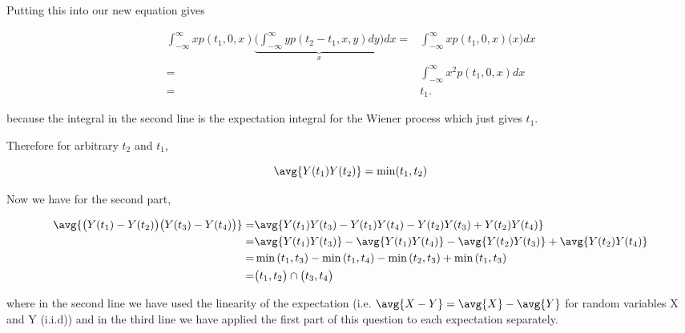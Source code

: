 Putting this into our new equation gives 

\begin{align*}
\int_{-\infty}^{\infty} x p(t_1, 0, x) \underbrace{ \bigg( \int_{-\infty}^{\infty} y p(t_2 - t_1, x, y)dy \bigg) }_x dx =& \int_{-\infty}^{\infty} x p(t_1, 0, x) \big( x \big) dx \\
= & \int_{-\infty}^{\infty} x^2 p(t_1, 0, x) dx\\
= & t_1 .
\end{align*}

because the integral in the second line is the expectation integral for the Wiener process which just gives $t_1$.

Therefore for arbitrary $t_2$ and $t_1$, 

\begin{equation*}
\avg{Y(t_1)Y(t_2)} = \min(t_1, t_2)
\end{equation*}

Now we have for the second part, 

\begin{align*}
\avg{ \big( Y(t_1) - Y(t_2) \big)  \big( Y(t_3) - Y(t_4) \big) } =& \avg{ Y(t_1)Y(t_3) - Y(t_1)Y(t_4) - Y(t_2)Y(t_3) + Y(t_2)Y(t_4) } \\
= & \avg{Y(t_1)Y(t_3) } - \avg{Y(t_1)Y(t_4)} - \avg{Y(t_2)Y(t_3)} + \avg{ Y(t_2)Y(t_4)}  \\
= & \min{(t_1,t_3)} - \min{(t_1,t_4)} - \min{(t_2,t_3)} + \min{(t_1,t_3)}  \\
= & \big( t_1, t_2 \big) \cap \big( t_3, t_4 \big)
\end{align*}

where in the second line we have used the linearity of the expectation (i.e. $\avg{ X - Y } = \avg{X} - \avg{Y}$ for random variables X and Y (i.i.d))  and in the third line we have applied the first part of this question to each expectation separately. 